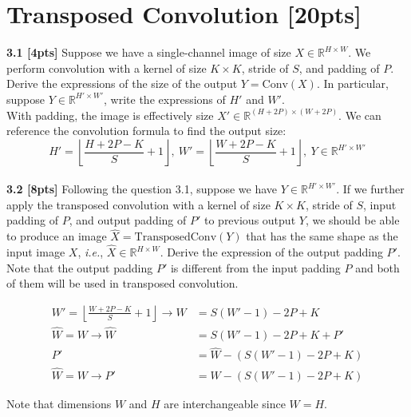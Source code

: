 \documentclass{article}
\begin{document}
\section{Transposed Convolution [20pts]}
\noindent
\textbf{3.1 [4pts]} Suppose we have a single-channel image of size $X \in \mathbb{R}^{H \times W}$. We perform convolution with a kernel of size $K \times K$, stride of $S$, and padding of $P$. Derive the expressions of the size of the output $Y = \text{Conv}(X)$. In particular, suppose $Y \in \mathbb{R}^{H' \times W'}$, write the expressions of $H'$ and $W'$.\\

{\color{blue}
With padding, the image is effectively size $X' \in \mathbb{R}^{(H+2P) \times (W+2P)}$. We can reference the convolution formula to find the output size:
\begin{equation}
    H'= \left \lfloor \frac{H+2P-K}{S}+1 \right \rfloor, \ W'= \left \lfloor \frac{W+2P-K}{S}+1 \right \rfloor, \ Y \in \mathbb{R}^{H' \times W'}
\end{equation}
}\\

\noindent
\textbf{3.2 [8pts]} Following the question 3.1, suppose we have $Y \in \mathbb{R}^{H' \times W'}$. If we further apply the transposed convolution with a kernel of size $K \times K$, stride of $S$, input padding of $P$, and output padding of $P'$ to previous output $Y$, we should be able to produce an image $\hat{X} = \text{TransposedConv}(Y)$ that has the same shape as the input image $X$, \textit{i.e.}, $\hat{X} \in \mathbb{R}^{H \times W}$. Derive the expression of the output padding $P'$. Note that the output padding $P'$ is different from the input padding $P$ and both of them will be used in transposed convolution.\\

{\color{blue}
\begin{equation}
    \begin{aligned}
       W'= \left \lfloor \frac{W+2P-K}{S}+1 \right \rfloor \rightarrow W&=S(W'-1)-2P+K\\
       \hat{W}=W \rightarrow \hat{W}&=S(W'-1)-2P+K+P'\\
       P'&=\hat{W}-(S(W'-1)-2P+K)\\
       \hat{W}=W \rightarrow P'&=W- \left(S(W'-1)-2P+K \right)
    \end{aligned}
\end{equation}

Note that dimensions $W$ and $H$ are interchangeable since $W=H$.
}\\
\end{document}
